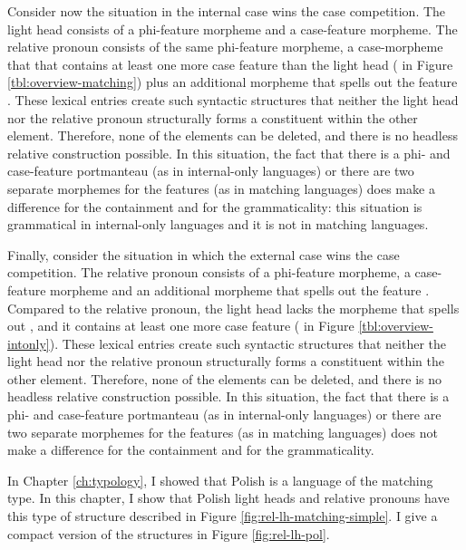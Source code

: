 Consider now the situation in the internal case wins the case competition. The light head consists of a phi-feature morpheme and a case-feature morpheme. The relative pronoun consists of the same phi-feature morpheme, a case-morpheme that that contains at least one more case feature than the light head ( in Figure \ref{tbl:overview-matching}) plus an additional morpheme that spells out the feature . These lexical entries create such syntactic structures that neither the light head nor the relative pronoun structurally forms a constituent within the other element. Therefore, none of the elements can be deleted, and there is no headless relative construction possible.
In this situation, the fact that there is a phi- and case-feature portmanteau (as in internal-only languages) or there are two separate morphemes for the features (as in matching languages) does make a difference for the containment and for the grammaticality: this situation is grammatical in internal-only languages and it is not in matching languages.

Finally, consider the situation in which the external case wins the case competition. The relative pronoun consists of a phi-feature morpheme, a case-feature morpheme and an additional morpheme that spells out the feature . Compared to the relative pronoun, the light head lacks the morpheme that spells out , and it contains at least one more case feature ( in Figure \ref{tbl:overview-intonly}). These lexical entries create such syntactic structures that neither the light head nor the relative pronoun structurally forms a constituent within the other element. Therefore, none of the elements can be deleted, and there is no headless relative construction possible.
In this situation, the fact that there is a phi- and case-feature portmanteau (as in internal-only languages) or there are two separate morphemes for the features (as in matching languages) does not make a difference for the containment and for the grammaticality.

In Chapter \ref{ch:typology}, I showed that Polish is a language of the matching type. In this chapter, I show that Polish light heads and relative pronouns have this type of structure described in Figure \ref{fig:rel-lh-matching-simple}. I give a compact version of the structures in Figure \ref{fig:rel-lh-pol}.

